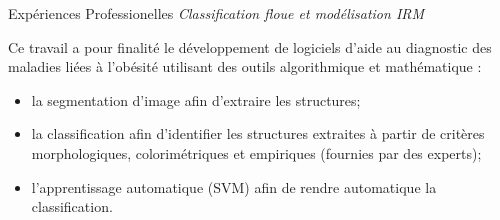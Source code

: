 \begin{rubric}{Expériences Professionelles}
\entry*[2004--2008]
\textit{Classification floue et modélisation IRM}
\par Ce travail a pour finalité le développement de logiciels d'aide au diagnostic
des maladies liées à l'obésité utilisant des outils algorithmique et mathématique : 
\begin{itemize}
\item la segmentation d'image afin d'extraire les structures;
\item la classification afin d'identifier les structures extraites à partir de critères morphologiques, colorimétriques et empiriques (fournies par des experts);
\item l'apprentissage automatique (SVM) afin de rendre automatique la classification.
\end{itemize}    



\end{rubric}
